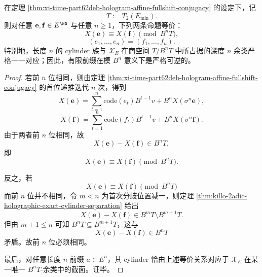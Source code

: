 \begin{corollary}\label{cor:xi-time-part62deb-hologram-prefix-congruence-bijection}
在定理 \ref{thm:xi-time-part62deb-hologram-affine-fullshift-conjugacy} 的设定下，记
\[
T:=T_2(E_{\min}).
\]
则对任意 \(\mathbf e,\mathbf f\in E^{\NN}\) 与任意 \(n\ge 1\)，下列两条命题等价：
\[
X(\mathbf e)\equiv X(\mathbf f)\pmod{B^nT},
\]
\[
(e_1,\dots,e_n)=(f_1,\dots,f_n).
\]
特别地，长度 \(n\) 的 cylinder 族与 \(\mathcal X_E\) 在商空间 \(T/B^nT\) 中所占据的深度 \(n\) 余类严格一一对应；因此，有限前缀在模 \(B^n\) 意义下是严格可逆的。
\end{corollary}
\begin{proof}
若前 \(n\) 位相同，则由定理 \ref{thm:xi-time-part62deb-hologram-affine-fullshift-conjugacy} 的首位递推迭代 \(n\) 次，得到
\[
X(\mathbf e)
=
\sum_{t=1}^{n}\mathrm{code}(e_t)B^{t-1}v
+B^nX(\sigma^n\mathbf e),
\]
\[
X(\mathbf f)
=
\sum_{t=1}^{n}\mathrm{code}(f_t)B^{t-1}v
+B^nX(\sigma^n\mathbf f).
\]
由于两者前 \(n\) 位相同，故
\[
X(\mathbf e)-X(\mathbf f)\in B^nT,
\]
即
\[
X(\mathbf e)\equiv X(\mathbf f)\pmod{B^nT}.
\]

反之，若
\[
X(\mathbf e)\equiv X(\mathbf f)\pmod{B^nT}
\]
而前 \(n\) 位并不相同，令 \(m<n\) 为首次分歧位置减一，则定理 \ref{thm:killo-2adic-holographic-exact-cylinder-separation} 给出
\[
X(\mathbf e)-X(\mathbf f)\in B^mT\setminus B^{m+1}T.
\]
但由 \(m+1\le n\) 可知 \(B^nT\subseteq B^{m+1}T\)，这与
\[
X(\mathbf e)-X(\mathbf f)\in B^nT
\]
矛盾。故前 \(n\) 位必须相同。

最后，对任意长度 \(n\) 前缀 \(a\in E^n\)，其 cylinder 恰由上述等价关系对应于 \(\mathcal X_E\) 在某一唯一 \(B^nT\)-余类中的截面。证毕。
\end{proof}

